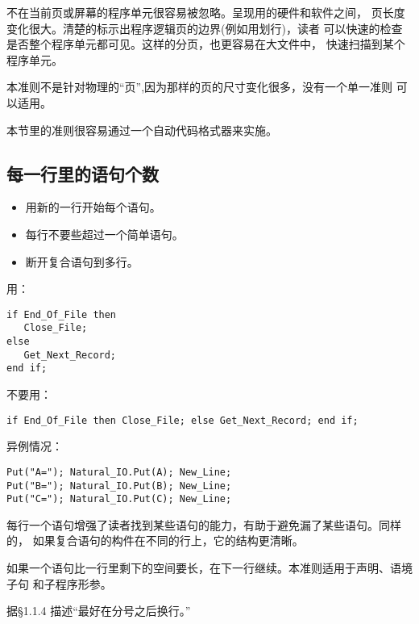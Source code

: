 \begin{blockindent}
不在当前页或屏幕的程序单元很容易被忽略。呈现用的硬件和软件之间，
页长度变化很大。清楚的标示出程序逻辑页的边界(例如用划行)，读者
可以快速的检查是否整个程序单元都可见。这样的分页，也更容易在大文件中，
快速扫描到某个程序单元。
\end{blockindent}

\begin{blockindent}
本准则不是针对物理的``页'',因为那样的页的尺寸变化很多，没有一个单一准则
可以适用。
\end{blockindent}

\begin{blockindent}
本节里的准则很容易通过一个自动代码格式器来实施。
\end{blockindent}

\subsection{每一行里的语句个数}
\begin{itemize}
    \item 用新的一行开始每个语句。
    \item 每行不要些超过一个简单语句。
    \item 断开复合语句到多行。
\end{itemize}

\begin{blockindent}
用：
\begin{lstlisting}
if End_Of_File then
   Close_File;
else
   Get_Next_Record;
end if;
\end{lstlisting}
不要用：
\begin{lstlisting}
if End_Of_File then Close_File; else Get_Next_Record; end if;
\end{lstlisting}
异例情况：
\begin{lstlisting}
Put("A="); Natural_IO.Put(A); New_Line;
Put("B="); Natural_IO.Put(B); New_Line;
Put("C="); Natural_IO.Put(C); New_Line;
\end{lstlisting}
\end{blockindent}

\begin{blockindent}
每行一个语句增强了读者找到某些语句的能力，有助于避免漏了某些语句。同样的，
如果复合语句的构件在不同的行上，它的结构更清晰。
\end{blockindent}

\begin{blockindent}
如果一个语句比一行里剩下的空间要长，在下一行继续。本准则适用于声明、语境子句
和子程序形参。

据\cite{arm95}\S{}1.1.4 描述``最好在分号之后换行。''
\end{blockindent}

